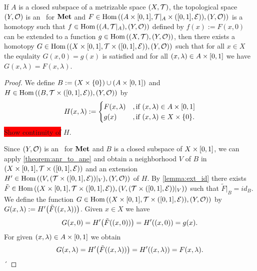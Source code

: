 \begin{theorem}
	If $A$ is a closed subspace of a metrizable space $\tspace$, the topological space $\tspace[Y][O]$ is an \anr\ for $\mathbf{Met}$ and $F \in \Hom\pbraces{\pbraces{A \times \bbraces{0, 1}, \mathcal{T}\vert_A \times \eucl}, \tspace[Y][O]}$ is a homotopy such that $f \in \Hom\pbraces{\reltspace[A], \tspace[Y][O]}$ defined by $f(x) := F(x, 0)$ can be extended to a function $g \in \Hom\pbraces{\tspace, \tspace[Y][O]}$, then there exists a homotopy $G \in \Hom\pbraces{\prodtspace, \tspace[Y][O]}$ such that for all $x \in X$ the equlaity $G(x, 0) = g(x)$ is satisfied and for all ${\left ( x, \lambda \right )} \in A \times {\left [ 0, 1 \right ]}$ we have $G(x, \lambda) = F(x, \lambda)$. 
\end{theorem}
\begin{proof}
	We define $B := {\left ( X \times {\left \{ 0 \right \}} \right )} \cup {\left ( A \times {\left [ 0, 1 \right ]} \right )}$ and $H \in \Hom\pbraces{\pbraces{B, \mathcal{T} \times \eucl}, \tspace[Y][O]}$ by 
	\begin{align*}
		H(x,\lambda) :=
		\begin{cases}
			F(x,\lambda) &, \text{if } (x, \lambda) \in A \times {\left [ 0, 1 \right ]} \\
			g(x) &, \text{if } {\left ( x, \lambda \right )} \in X \times {\left \{ 0 \right \}}.
		\end{cases}
	\end{align*}
	\colorbox{red}{Show continuity of} $H$. 
	
	Since $\tspace[Y][O]$ is an \anr\ for $\mathbf{Met}$ and $B$ is a closed subspace of $X \times {\left [ 0, 1 \right ]}$, we can apply \ref{theorem:anr_to_ane} and obtain a neighborhood $V$ of $B$ in $\prodtspace$ and an extension $H^\prime \in \Hom\pbraces{\pbraces{V, \pbraces{\mathcal{T} \times \eucl}\vert_V}, \tspace[Y][O]}$ of $H$. By \ref{lemma:ext_id} there exists $\tilde{F} \in \Hom\pbraces{\prodtspace, \pbraces{V, \pbraces{\mathcal{T} \times \eucl}\vert_V}}$ such that $\tilde{F}\vert_B = id_B$. We define the function $G \in \Hom\pbraces{\prodtspace, \tspace[Y][O]}$ by $G(x, \lambda) := H^\prime {\left ( \tilde{F}{\left ( (x, \lambda) \right )} \right )}$. Given $x \in X$ we have 
	\begin{align*}
		G(x, 0) = H^\prime{\left ( \tilde{F}{\left ( {\left ( x, 0 \right )} \right )} \right )} =  H^\prime{\left ( {\left ( x, 0 \right )} \right )} = g(x).	
	\end{align*}
	For given ${\left ( x, \lambda \right )} \in A \times {\left [ 0, 1 \right ]}$ we obtain
	\begin{align*}
		G(x, \lambda) = H^\prime{\left ( \tilde{F}{\left ( {\left ( x, \lambda \right )} \right )} \right )} = H^\prime{\left ( {\left ( x, \lambda \right )} \right )} = F{\left ( x, \lambda \right )}. 
	\end{align*} ´
\end{proof}